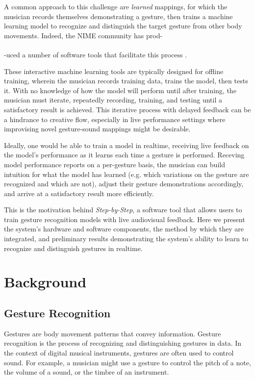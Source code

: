 \documentclass{nime-alternate} %
\begin{document}
A common approach to this challenge are \textit{learned} mappings, for which the musician records themselves demonstrating a gesture, then trains a machine learning model to recognize and distinguish the target gesture from other body movements. Indeed, the NIME community has prod-\\\\-uced a number of software tools that facilitate this process \cite{bullock:mllib,fiebrink:wekinator, gillian:toolkit, caramiaux:nimeml, mcpherson:pipeline}.

These interactive machine learning tools are typically designed for offline training, wherein the musician records training data, trains the model, then tests it. With no knowledge of how the model will perform until after training, the musician must iterate, repeatedly recording, training, and testing until a satisfactory result is achieved. This iterative process with delayed feedback can be a hindrance to creative flow, especially in live performance settings where improvising novel gesture-sound mappings might be desirable.

Ideally, one would be able to train a model in realtime, receiving live feedback on the model's performance as it learns each time a gesture is performed. Receving model performance reports on a per-gesture basis, the musician can build intuition for what the model has learned (e.g. which variations on the gesture are recognized and which are not), adjust their gesture demonstrations accordingly, and arrive at a satisfactory result more efficiently.

This is the motivation behind \textit{Step-by-Step}, a software tool that allows users to train gesture recognition models with live audiovisual feedback. Here we present the system's hardware and software components, the method by which they are integrated, and preliminary results demonstrating the system's ability to learn to recognize and distinguish gestures in realtime.

\section{Background}
\subsection{Gesture Recognition}
Gestures are body movement patterns that convey information. Gesture recognition is the process of recognizing and distinguishing gestures in data. In the context of digital musical instruments, gestures are often used to control sound. For example, a musician might use a gesture to control the pitch of a note, the volume of a sound, or the timbre of an instrument.
\end{document}
